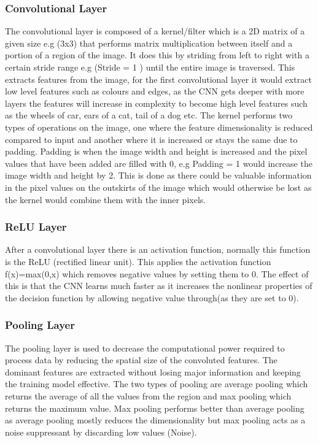 \documentclass{csfyp}
\begin{document}
\subsubsection{Convolutional Layer}
The convolutional layer is composed of a kernel/filter which is a 2D matrix of a given size e.g (3x3) that performs matrix multiplication between itself and a portion of a region of the image. It does this by striding from left to right with a certain stride range e.g (Stride = 1 ) until the entire image is traversed. This extracts features from the image, for the first convolutional layer it would extract low level features such as colours and edges, as the CNN gets deeper with more layers the features will increase in complexity to become high level features such as the wheels of car, ears of a cat, tail of a dog etc. The kernel performs two types of operations on the image, one where the feature dimensionality is reduced compared to input and another where it is increased or stays the same due to padding. Padding is when the image width and height is increased and the pixel values that have been added are filled with 0, e.g Padding = 1 would increase the image width and height by 2. This is done as there could be valuable information in the pixel values on the outskirts of the image which would otherwise be lost as the kernel would combine them with the inner pixels.

\subsubsection{ReLU Layer}
After a convolutional layer there is an activation function, normally this function is the ReLU (rectified linear unit). This applies the activation function f(x)=max(0,x) which removes negative values by setting them to 0. The effect of this is that the CNN learns much faster as it increases the nonlinear properties of the decision function by allowing negative value through(as they are set to 0).

\subsubsection{Pooling Layer}
The pooling layer is used to decrease the computational power required to process data by reducing the spatial size of the convoluted features. The dominant features are extracted without losing major information and keeping the training model effective. The two types of pooling are average pooling which returns the average of all the values from the region and max pooling which returns the maximum value. Max pooling performs better than average pooling as average pooling mostly reduces the dimensionality but max pooling acts as a noise suppressant by discarding low values (Noise).
\end{document}
